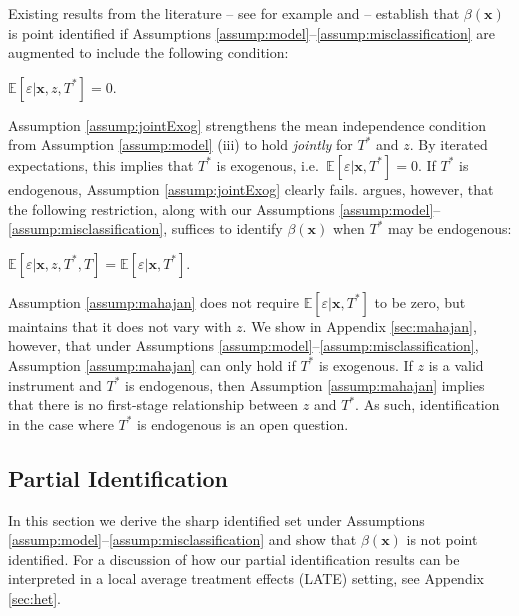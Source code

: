 Existing results from the literature -- see for example \cite{FL} and \cite{Mahajan} -- establish that $\beta(\mathbf{x})$ is point identified if Assumptions \ref{assump:model}--\ref{assump:misclassification} are augmented to include the following condition:
\begin{assump} \mbox{}
  \label{assump:jointExog}
    $\mathbb{E}[\varepsilon|\mathbf{x},z, T^*] = 0$.
\end{assump}

Assumption \ref{assump:jointExog} strengthens the mean independence condition from Assumption \ref{assump:model} (iii) to hold \emph{jointly} for $T^*$ and $z$.
By iterated expectations, this implies that $T^*$ is exogenous, i.e.\ $\mathbb{E}[\varepsilon|\mathbf{x},T^*] = 0$.
If $T^*$ is endogenous, Assumption \ref{assump:jointExog} clearly fails.
\cite{Mahajan} argues, however, that the following restriction, along with our Assumptions \ref{assump:model}--\ref{assump:misclassification}, suffices to identify $\beta(\mathbf{x})$ when $T^*$ may be endogenous:
\begin{assump} \mbox{}
  \label{assump:mahajan}
  $\mathbb{E}[\varepsilon|\mathbf{x}, z, T^*, T] = \mathbb{E}[\varepsilon|\mathbf{x},T^*]$.
\end{assump}
Assumption \ref{assump:mahajan} does not require $\mathbb{E}[\varepsilon|\mathbf{x},T^*]$ to be zero, but maintains that it does not vary with $z$.
We show in Appendix \ref{sec:mahajan}, however, that under 
Assumptions \ref{assump:model}--\ref{assump:misclassification}, Assumption \ref{assump:mahajan} can only hold if $T^*$ is exogenous.
If $z$ is a valid instrument and $T^*$ is endogenous, then Assumption \ref{assump:mahajan} implies that there is no first-stage relationship between $z$ and $T^*$.
As such, identification in the case where $T^*$ is endogenous is an open question. 




\subsection{Partial Identification}
\label{sec:partial}

In this section we derive the sharp identified set under Assumptions \ref{assump:model}--\ref{assump:misclassification} and show that  $\beta(\mathbf{x})$ is not point identified.
For a discussion of how our partial identification results can be interpreted in a local average treatment effects (LATE) setting, see Appendix \ref{sec:het}.

